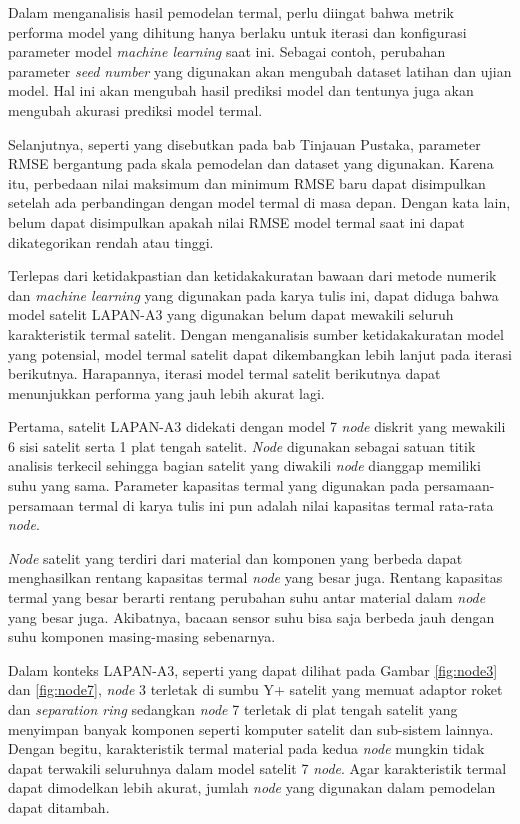 Dalam menganalisis hasil pemodelan termal, perlu diingat bahwa metrik performa
model yang dihitung hanya berlaku untuk iterasi dan konfigurasi parameter model
\textit{machine learning} saat ini. Sebagai contoh, perubahan parameter
\textit{seed number} yang digunakan akan mengubah dataset latihan dan ujian
model. Hal ini akan mengubah hasil prediksi model dan tentunya juga akan mengubah
akurasi prediksi model termal. 

Selanjutnya, seperti yang disebutkan pada bab Tinjauan Pustaka, parameter RMSE
bergantung pada skala pemodelan dan dataset yang digunakan. Karena itu,
perbedaan nilai maksimum dan minimum RMSE baru dapat disimpulkan setelah ada
perbandingan dengan model termal di masa depan. Dengan kata lain, belum dapat
disimpulkan apakah nilai RMSE model termal saat ini dapat dikategorikan rendah
atau tinggi.

Terlepas dari ketidakpastian dan ketidakakuratan bawaan dari metode numerik dan
\textit{machine learning} yang digunakan pada karya tulis ini, dapat diduga
bahwa model satelit LAPAN-A3 yang digunakan belum dapat mewakili seluruh
karakteristik termal satelit. Dengan menganalisis sumber ketidakakuratan model
yang potensial, model termal satelit dapat dikembangkan lebih lanjut pada
iterasi berikutnya. Harapannya, iterasi model termal satelit berikutnya dapat
menunjukkan performa yang jauh lebih akurat lagi.

Pertama, satelit LAPAN-A3 didekati dengan model 7 \textit{node} diskrit yang
mewakili 6 sisi satelit serta 1 plat tengah satelit. \textit{Node} digunakan sebagai
satuan titik analisis terkecil sehingga bagian satelit yang diwakili \textit{node}
dianggap memiliki suhu yang sama. Parameter kapasitas termal yang digunakan
pada persamaan-persamaan termal di karya tulis ini pun adalah nilai kapasitas
termal rata-rata \textit{node}. 

\textit{Node} satelit yang terdiri dari material dan komponen yang berbeda dapat
menghasilkan rentang kapasitas termal \textit{node} yang besar juga. Rentang kapasitas
termal yang besar berarti rentang perubahan suhu antar material dalam \textit{node} yang
besar juga. Akibatnya, bacaan sensor suhu bisa saja berbeda jauh dengan suhu
komponen masing-masing sebenarnya.

Dalam konteks LAPAN-A3, seperti yang dapat dilihat pada Gambar \ref{fig:node3} dan \ref{fig:node7}, \textit{node} 3 terletak di sumbu Y+ satelit yang memuat adaptor
roket dan \textit{separation ring} sedangkan \textit{node} 7 terletak di plat tengah
satelit yang menyimpan banyak komponen seperti komputer satelit dan sub-sistem
lainnya. Dengan begitu, karakteristik termal material pada kedua \textit{node} mungkin
tidak dapat terwakili seluruhnya dalam model satelit 7 \textit{node}. Agar karakteristik
termal dapat dimodelkan lebih akurat, jumlah \textit{node} yang digunakan dalam
pemodelan dapat ditambah.

